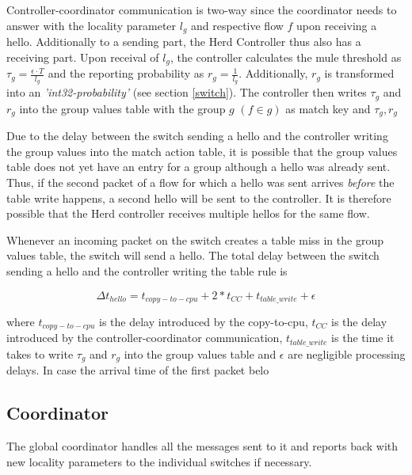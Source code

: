 \documentclass[11pt,oneside,a4paper]{article}
\begin{document}
Controller-coordinator communication is two-way since the coordinator needs to answer with the locality parameter $l_g$ and respective flow $f$ upon receiving a hello. Additionally to a sending part, the Herd Controller thus also has a receiving part. Upon receival of $l_g$, the controller calculates the mule threshold as $\tau_g = \frac{\epsilon \cdot T}{l_g}$ and the reporting probability as $r_g = \frac{1}{l_g}$. Additionally, $r_g$ is transformed into an \textit{'int32-probability'} (see section \ref{switch}). The controller then writes $\tau_g$ and $r_g$ into the group values table with the group $g$ $(f \in g)$ as match key and $\tau_g, r_g$ 




Due to the delay between the switch sending a hello and the controller writing the group values into the match action table, it is possible that the group values table does not yet have an entry for a group although a hello was already sent. Thus, if the second packet of a flow for which a hello was sent arrives \textit{before} the table write happens, a second hello will be sent to the controller. It is therefore possible that the Herd controller receives multiple hellos for the same flow. 





Whenever an incoming packet on the switch creates a table miss in the group values table, the switch will send a hello. The total delay between the switch sending a hello and the controller writing the table rule is 

$$\Delta t_{hello} = t_{copy-to-cpu} + 2*t_{CC} + t_{table\_write} + \epsilon$$

\noindent where $t_{copy-to-cpu}$ is the delay introduced by the copy-to-cpu, $t_{CC}$ is the delay introduced by the controller-coordinator communication, $t_{table\_write}$ is the time it takes to write $\tau_g$ and $r_g$ into the group values table and $\epsilon$ are negligible processing delays. In case the arrival time of the first packet belo

 




\subsection{Coordinator} \label{coordinator}
The global coordinator handles all the messages sent to it and reports back with new locality parameters to the individual switches if necessary. 
\end{document}
